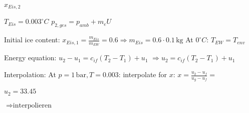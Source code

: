 \( x_{Eis,2} \)  

\( T_{Eis} = 0.003^\circ C \)  
\( p_{2,ges} = p_{amb} + m_e U \)  

Initial ice content:  
\( x_{Eis,1} = \frac{m_{Eis}}{m_{EW}} = 0.6 \Rightarrow m_{Eis} = 0.6 \cdot 0.1 \, \text{kg} \)  
At \( 0^\circ C \): \( T_{EW} = T_{env} \)  

Energy equation:  
\( u_2 - u_1 = c_{if} (T_2 - T_1) + u_1 \)  
\( \Rightarrow u_2 = c_{if} (T_2 - T_1) + u_1 \)  

Interpolation:  
At \( p = 1 \, \text{bar}, T = 0.003 \): interpolate for \( x \):  
\( x = \frac{u_2 - u_f}{u_g - u_f} = \)  

\( u_2 = 33.45 \)  

\( \Rightarrow \text{interpolieren} \)